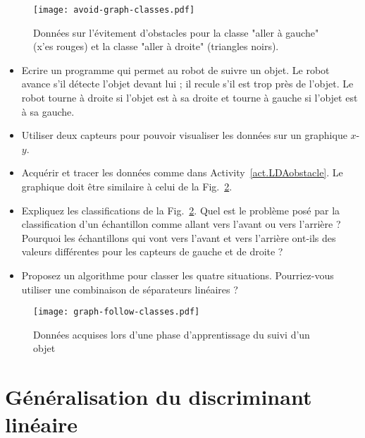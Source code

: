 \begin{figure}
\begin{center}
\texttt{[image: avoid-graph-classes.pdf]}
\end{center}
\caption{Données sur l'évitement d'obstacles pour la classe "aller à gauche" (x'es rouges) et la classe "aller à droite" (triangles noirs).}\label{fig.machlearnavoid}
\end{figure}

\begin{framed}
\begin{itemize}
\item Ecrire un programme qui permet au robot de suivre un objet. Le robot avance s'il détecte l'objet devant lui ; il recule s'il est trop près de l'objet. Le robot tourne à droite si l'objet est à sa droite et tourne à gauche si l'objet est à sa gauche.
\item Utiliser deux capteurs pour pouvoir visualiser les données sur un graphique $x$-$y$.
\item Acquérir et tracer les données comme dans Activity~\ref{act.LDAobstacle}. Le graphique doit être similaire à celui de la Fig.~\ref{fig.machlearnfollow}.
\item Expliquez les classifications de la Fig.~\ref{fig.machlearnfollow}. Quel est le problème posé par la classification d'un échantillon comme allant vers l'avant ou vers l'arrière ? Pourquoi les échantillons qui vont vers l'avant et vers l'arrière ont-ils des valeurs différentes pour les capteurs de gauche et de droite ?
\item Proposez un algorithme pour classer les quatre situations. Pourriez-vous utiliser une combinaison de séparateurs linéaires ?
\end{itemize}
\end{framed}

\begin{figure}
\begin{center}
\texttt{[image: graph-follow-classes.pdf]}
\end{center}
\caption{Données acquises lors d'une phase d'apprentissage du suivi d'un objet}\label{fig.machlearnfollow}
\end{figure}

\section{Généralisation du discriminant linéaire}\label{s.gen-lda}

